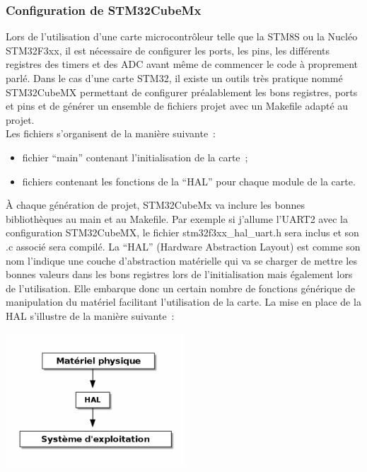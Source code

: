 \documentclass{article}
\begin{document}
\subsubsection{Configuration de STM32CubeMx}

Lors de l'utilisation d'une carte microcontrôleur telle que la STM8S ou la Nucléo STM32F3xx, il est nécessaire de configurer les ports, les pins, les différents registres des timers et des ADC avant même de commencer le code à proprement parlé. Dans le cas d'une carte STM32, il existe un outils très pratique nommé STM32CubeMX permettant de configurer préalablement les bons registres, ports et pins et de générer un ensemble de fichiers projet avec un Makefile adapté au projet. \\

Les fichiers s'organisent de la manière suivante~: \\
\begin{itemize}
  \item fichier ``main'' contenant l'initialisation de la carte~;
  \item fichiers contenant les fonctions de la ``HAL'' pour chaque module de la carte. \\
\end{itemize}

À chaque génération de projet, STM32CubeMx va inclure les bonnes bibliothèques au main et au Makefile. Par exemple si j'allume l'UART2 avec la configuration STM32CubeMX, le fichier stm32f3xx\_hal\_uart.h sera inclus et son .c associé sera compilé. La ``HAL'' (Hardware Abstraction Layout) est comme son nom l'indique une couche d'abstraction matérielle qui va se charger de mettre les bonnes valeurs dans les bons registres lors de l'initialisation mais également lors de l'utilisation. Elle embarque donc un certain nombre de fonctions générique de manipulation du matériel facilitant l'utilisation de la carte. La mise en place de la HAL s'illustre de la manière suivante~:\\

\begin{center}
  \includegraphics[height=5cm]{diag_HAL.png}
\end{center}
\end{document}
